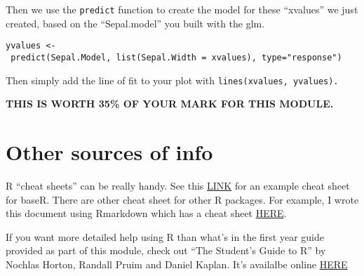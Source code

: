\documentclass[]{book}
\begin{document}
Then we use the \texttt{predict} function to create the model for these
``xvalues'' we just created, based on the ``Sepal.model'' you built with
the glm.

\texttt{yvalues\ \textless{}-\ predict(Sepal.Model,\ list(Sepal.Width\ =\ xvalues),\ type="response")}

Then simply add the line of fit to your plot with
\texttt{lines(xvalues,\ yvalues).}

\textbf{THIS IS WORTH 35\% OF YOUR MARK FOR THIS MODULE.}

\chapter{Other sources of info}\label{other-sources-of-info}

R ``cheat sheets'' can be really handy. See this
\href{https://rstudio.com/wp-content/uploads/2016/05/base-r.pdf}{LINK}
for an example cheat sheet for baseR. There are other cheat sheet for
other R packages. For example, I wrote this document using Rmarkdown
which has a cheat sheet
\href{https://rstudio.com/wp-content/uploads/2015/02/rmarkdown-cheatsheet.pdf}{HERE}.

If you want more detailed help using R than what's in the first year
guide provided as part of this module, check out ``The Student's Guide
to R'' by Nochlas Horton, Randall Pruim and Daniel Kaplan. It's
availalbe online
\href{https://cran.r-project.org/doc/contrib/Horton+Pruim+Kaplan_MOSAIC-StudentGuide.pdf}{HERE}


\end{document}
